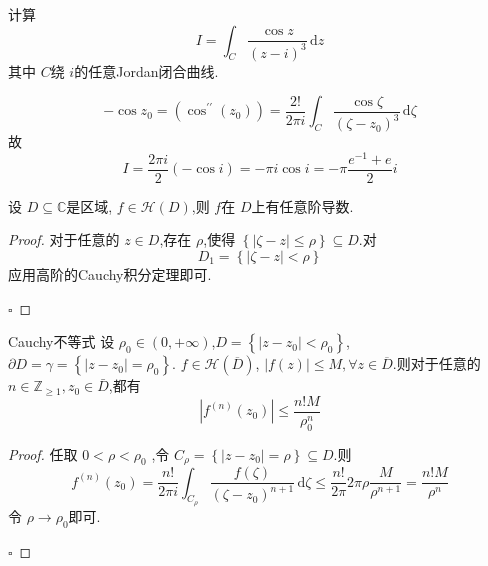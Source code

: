 \documentclass[../../复变函数.tex]{subfiles}
\begin{document}
\begin{example}
    计算 \[
    I =  \int_{C}\frac{\cos z }{\left( z-i \right)^{3}  }\,\mathrm{d} z 
    \]其中 \(  C  \)绕 \(  i  \)的任意Jordan闭合曲线.  
\end{example}

\hspace*{\fill} 
\begin{solution}
    \[
   -\cos z_0=  \left( \cos ^{\prime \prime} \left( z_0 \right)  \right)= \frac{2! }{2\pi i }\int _{C}\frac{\cos \zeta  }{\left( \zeta -z_0 \right)^{3}  }\,\mathrm{d} \zeta    
    \]故 \[
    I = \frac{2\pi i }{2 }\left( -\cos i \right)= -\pi i\cos i= -\pi \frac{e^{-1}+ e }{2 }i   
    \]
\end{solution}

\hspace*{\fill} 
\begin{corollary}
    设 \(  D\subseteq \mathbb{C}   \)是区域, \(  f\in \mathcal{H}\left( D \right)   \),则 \(  f  \)在 \(  D  \)上有任意阶导数.    
\end{corollary}

\begin{proof}
    对于任意的 \(  z \in D  \),存在 \(  \rho   \),使得 \(  \left\{ \left| \zeta -z \right|\le \rho   \right\}\subseteq D  \).对 \[
    D_1= \left\{ \left| \zeta -z \right|< \rho   \right\}
    \]应用高阶的Cauchy积分定理即可.   

    \hfill $\square$
\end{proof}

\begin{theorem}{Cauchy不等式}
    设 \(  \rho _0 \in \left( 0,+ \infty \right)   \),\(  D =  \left\{ \left| z-z_0 \right|< \rho _0   \right\}  \),\(   \partial D =   \gamma = \left\{ \left| z-z_0 \right|= \rho _0   \right\}  \). \(  f \in \mathcal{H}\left( \overline{D} \right)   \), \(  \left| f\left( z \right)  \right|\le M,\forall z \in  \overline{D}   \).则对于任意的 \(  n \in \mathbb{Z} _{\ge 1},z_0 \in \bar{D}  \),都有 \[
    \left| f^{\left( n \right) }\left( z_0 \right)  \right|\le \frac{n!M }{\rho _0 ^{n} }  
    \]      
\end{theorem}

\begin{proof}
    任取 \(  0< \rho < \rho _0   \) ,令 \(  C_{\rho }= \left\{ \left| z-z_0 \right|= \rho   \right\}\subseteq D  \).则 \[
    f^{\left( n \right) }\left( z_0 \right)= \frac{n! }{2\pi i }\int_{C_{\rho }}  \frac{f\left( \zeta  \right)  }{ \left( \zeta -z_0 \right)^{n+ 1} }\,\mathrm{d} \zeta \le  \frac{n! }{2\pi  }2\pi \rho \frac{M }{\rho ^{n+ 1} }=  \frac{n! M}{\rho ^{n} }    
    \] 令 \(  \rho \to \rho _0   \)即可. 

    \hfill $\square$
\end{proof}
\end{document}
